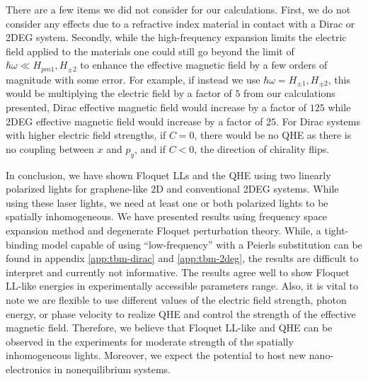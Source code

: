 There are a few items we did not consider for our calculations.
First, we do not consider any effects due to a refractive index material in contact with a Dirac or 2DEG system.
Secondly, while the high-frequency expansion limits the electric field applied to the materials one could still go beyond the limit of $\hbar \omega \ll H_{pm1}, H_{\pm2}$ to enhance the effective magnetic field by a few orders of magnitude with some error.
For example, if instead we use $\hbar\omega = H_{\pm1}, H_{\pm2}$, this would be multiplying the electric field by a factor of $5$ from our calculations presented, Dirac effective magnetic field would increase by a factor of $125$ while 2DEG effective magnetic field would increase by a factor of $25$.
For Dirac systems with higher electric field strengths, if $C=0$, there would be no QHE as there is no coupling between $x$ and $p_y$, and if $C<0$, the direction of chirality flips.

In conclusion, we have shown Floquet LLs and the QHE using two linearly polarized lights for graphene-like 2D and conventional 2DEG systems.
While using these laser lights, we  need at least one or both polarized lights to be spatially inhomogeneous.
We have presented results using frequency space expansion method and degenerate Floquet perturbation theory.
While, a tight-binding model capable of using ``low-frequency'' with a Peierls substitution can be found in appendix \ref{app:tbm-dirac} and \ref{app:tbm-2deg}, the results are difficult to interpret and currently not informative.
The results agree well to show Floquet LL-like energies in experimentally accessible parameters range.
Also, it is vital to note we are flexible to use different values of the electric field strength, photon energy, or phase velocity to realize QHE and control the strength of the effective magnetic field.
Therefore, we believe that Floquet LL-like and QHE can be observed in the experiments for moderate strength of the spatially inhomogeneous lights. Moreover, we expect the potential to host new nano-electronics in nonequilibrium systems.


